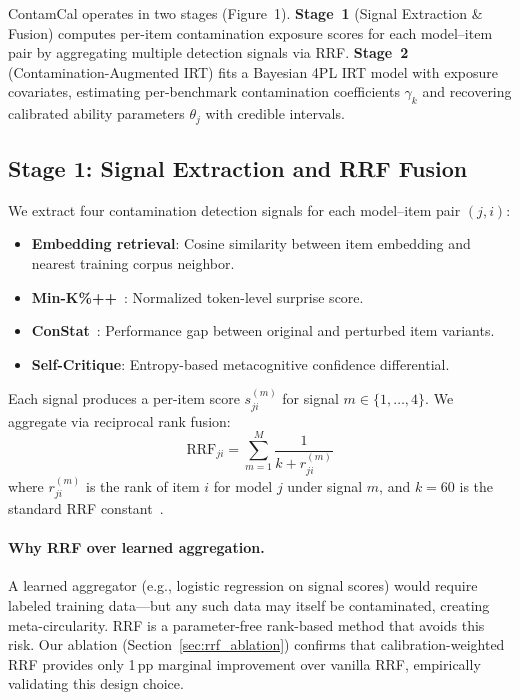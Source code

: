 \documentclass[letterpaper]{article}
\begin{document}
ContamCal operates in two stages (Figure~1).
\textbf{Stage~1} (Signal Extraction \& Fusion) computes per-item contamination exposure scores for each model--item pair by aggregating multiple detection signals via RRF.
\textbf{Stage~2} (Contamination-Augmented IRT) fits a Bayesian 4PL IRT model with exposure covariates, estimating per-benchmark contamination coefficients $\gamma_k$ and recovering calibrated ability parameters $\theta_j$ with credible intervals.

\subsection{Stage 1: Signal Extraction and RRF Fusion}
\label{sec:stage1}

We extract four contamination detection signals for each model--item pair $(j, i)$:
\begin{itemize}[leftmargin=*,itemsep=1pt]
\item \textbf{Embedding retrieval}: Cosine similarity between item embedding and nearest training corpus neighbor.
\item \textbf{Min-K\%++}~\citep{shi2024detecting}: Normalized token-level surprise score.
\item \textbf{ConStat}~\citep{dekoninck2024constat}: Performance gap between original and perturbed item variants.
\item \textbf{Self-Critique}: Entropy-based metacognitive confidence differential.
\end{itemize}

Each signal produces a per-item score $s^{(m)}_{ji}$ for signal $m \in \{1,\ldots,4\}$.
We aggregate via reciprocal rank fusion:
\begin{equation}
\text{RRF}_{ji} = \sum_{m=1}^{M} \frac{1}{k + r^{(m)}_{ji}}
\end{equation}
where $r^{(m)}_{ji}$ is the rank of item $i$ for model $j$ under signal $m$, and $k{=}60$ is the standard RRF constant~\citep{cormack2009reciprocal}.

\paragraph{Why RRF over learned aggregation.}
A learned aggregator (e.g., logistic regression on signal scores) would require labeled training data---but any such data may itself be contaminated, creating meta-circularity.
RRF is a parameter-free rank-based method that avoids this risk.
Our ablation (Section~\ref{sec:rrf_ablation}) confirms that calibration-weighted RRF provides only 1\,pp marginal improvement over vanilla RRF, empirically validating this design choice.
\end{document}
